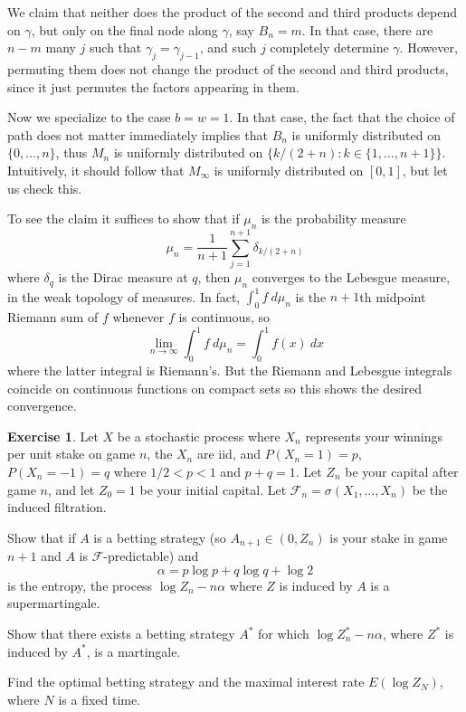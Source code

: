 \documentclass[10pt]{article}
\theoremstyle{definition}
\newtheorem{exer}{Exercise}
\begin{document}
We claim that neither does the product of the second and third products depend on $\gamma$, but only on the final node along $\gamma$, say $B_n = m$.
In that case, there are $n - m$ many $j$ such that $\gamma_j = \gamma_{j-1}$, and such $j$ completely determine $\gamma$.
However, permuting them does not change the product of the second and third products, since it just permutes the factors appearing in them.

Now we specialize to the case $b = w = 1$.
In that case, the fact that the choice of path does not matter immediately implies that $B_n$ is uniformly distributed on $\{0, \dots, n\}$, thus $M_n$ is uniformly distributed on $\{k/(2+n): k \in \{1, \dots, n + 1\}\}$.
Intuitively, it should follow that $M_\infty$ is uniformly distributed on $[0, 1]$, but let us check this.

To see the claim it suffices to show that if $\mu_n$ is the probability measure
$$\mu_n = \frac{1}{n + 1} \sum_{j=1}^{n+1} \delta_{k/(2+n)}$$
where $\delta_q$ is the Dirac measure at $q$, then $\mu_n$ converges to the Lebesgue measure, in the weak topology of measures.
In fact, $\int_0^1 f ~d\mu_n$ is the $n+1$th midpoint Riemann sum of $f$ whenever $f$ is continuous, so
$$\lim_{n \to \infty} \int_0^1 f ~d\mu_n = \int_0^1 f(x) ~dx$$
where the latter integral is Riemann's. But the Riemann and Lebesgue integrals coincide on continuous functions on compact sets so this shows the desired convergence.

\begin{exer}
Let $X$ be a stochastic process where $X_n$ represents your winnings per unit stake on game $n$, the $X_n$ are iid, and $P(X_n = 1) = p$, $P(X_n = -1) = q$ where $1/2 < p < 1$ and $p + q = 1$.
Let $Z_n$ be your capital after game $n$, and let $Z_0 = 1$ be your initial capital.
Let $\mathcal F_n = \sigma(X_1, \dots, X_n)$ be the induced filtration.

Show that if $A$ is a betting strategy (so $A_{n+1} \in (0, Z_n)$ is your stake in game $n + 1$ and $A$ is $\mathcal F$-predictable) and
$$\alpha = p \log p + q \log q + \log 2$$
is the entropy, the process $\log Z_n - n\alpha$ where $Z$ is induced by $A$ is a supermartingale.

Show that there exists a betting strategy $A^*$ for which $\log Z_n^* - n\alpha$, where $Z^*$ is induced by $A^*$, is a martingale.

Find the optimal betting strategy and the maximal interest rate $E(\log Z_N)$, where $N$ is a fixed time.
\end{exer}
\end{document}
